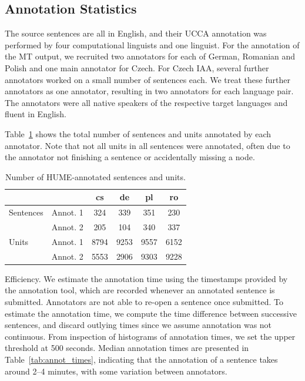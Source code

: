 \documentclass[11pt,letterpaper]{article}
\makeatletter
\renewcommand{\paragraph}{
  \@startsection{paragraph}{4}
  {\z@}{.3ex \@plus .3ex \@minus .2ex}{-1em}
  {\normalfont\normalsize\bfseries}
}
\newcommand{\tabref}[1]{Table~\ref{#1}}
\makeatother
\begin{document}
\subsection{Annotation Statistics}
\label{sec:annot_stats}

The source sentences are all in English, and their UCCA annotation was performed by four
computational linguists and one linguist.
For the annotation of the MT output, we recruited two annotators for each of German, Romanian
and Polish and one main annotator for Czech. For Czech IAA,
several further annotators worked on a small number of 
sentences each. We treat these further annotators as one annotator, resulting in two annotators
for each language pair.
The annotators were all native speakers of the respective target languages and fluent in English.

\tabref{tab:annot}
shows the total number of sentences and units annotated by each annotator. Note
that not all units in all sentences were annotated, often
due to
the annotator not finishing a sentence or accidentally missing a node.
\begin{table}
\begin{center}
{\small
\begin{tabular}{ll|cccc}
& & cs & de & pl & ro \\
\hline
Sentences &  Annot. 1 & 324   & 339  & 351  & 230  \\
 & Annot. 2 & 205 & 104  & 340  & 337 \\
\hline
Units & Annot. 1 & 8794  & 9253 & 9557  & 6152 \\
 &Annot. 2 & 5553 & 2906  & 9303  & 9228  \\
\end{tabular}
\caption{Number of HUME-annotated sentences and units.}
\label{tab:annot}
}
\end{center}
\end{table}

\paragraph{Efficiency.}
We estimate the annotation time using the timestamps
provided by the annotation tool, which are recorded whenever an annotated sentence is
submitted. Annotators are not able to re-open a sentence once submitted. 
To estimate the annotation time, we compute the time difference between successive 
sentences, and discard outlying times since we assume annotation was not continuous.
From inspection of histograms of annotation times, we set the upper threshold at 500 seconds.
Median annotation times are presented in Table~\ref{tab:annot_times},
indicating that the annotation
of a sentence takes around 2--4 minutes, with some variation between annotators.
\end{document}
